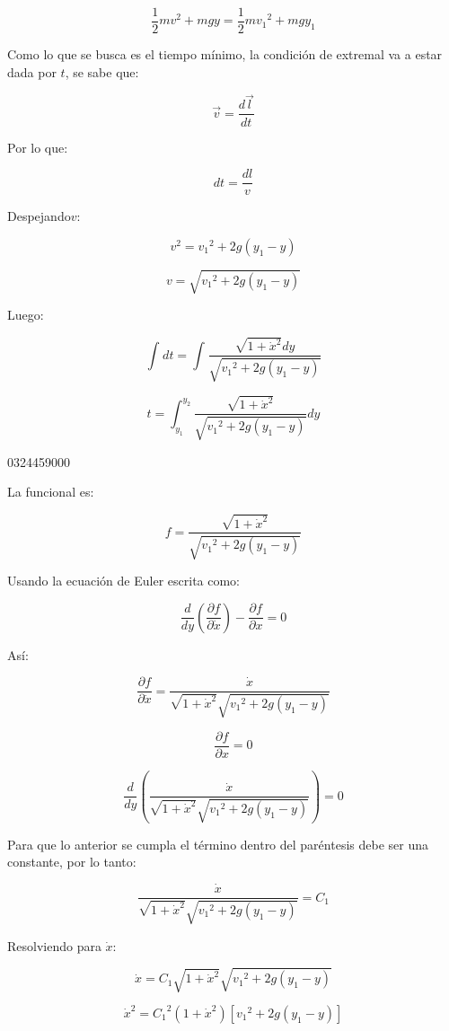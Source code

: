 \documentclass[]{article}
\begin{document}
\[\frac{1}{2}mv^{2} + mgy = \frac{1}{2}m{v_{1}}^{2} + mgy_{1}\]

Como lo que se busca es el tiempo mínimo, la condición de extremal va a
estar dada por \(t\), se sabe que:

\[\overrightarrow{v} = \frac{d\overrightarrow{l}}{dt}\]

Por lo que:

\[dt = \frac{dl}{v}\]

Despejando\(v\):

\[v^{2} = {v_{1}}^{2} + 2g\left( y_{1} - y \right)\]

\[v = \sqrt{{v_{1}}^{2} + 2g\left( y_{1} - y \right)}\]

Luego:

\[\int_{}^{}{dt} = \int_{}^{}\frac{\sqrt{1 + {\dot{x}}^{2}}dy}{\sqrt{{v_{1}}^{2} + 2g\left( y_{1} - y \right)}}\]

\[t = \int_{y_{1}}^{y_{2}}{\frac{\sqrt{1 + {\dot{x}}^{2}}}{\sqrt{{v_{1}}^{2} + 2g\left( y_{1} - y \right)}}dy}\]

0324459000

La funcional es:

\[f = \frac{\sqrt{1 + {\dot{x}}^{2}}}{\sqrt{{v_{1}}^{2} + 2g\left( y_{1} - y \right)}}\]

Usando la ecuación de Euler escrita como:

\[\frac{d}{dy}\left( \frac{\partial f}{\partial\dot{x}} \right) - \frac{\partial f}{\partial x} = 0\]

Así:

\[\frac{\partial f}{\partial\dot{x}} = \frac{\dot{x}}{\sqrt{1 + {\dot{x}}^{2}}\sqrt{{v_{1}}^{2} + 2g\left( y_{1} - y \right)}}\]

\[\frac{\partial f}{\partial x} = 0\]

\[\frac{d}{dy}\left( \frac{\dot{x}}{\sqrt{1 + {\dot{x}}^{2}}\sqrt{{v_{1}}^{2} + 2g\left( y_{1} - y \right)}} \right) = 0\]

Para que lo anterior se cumpla el término dentro del paréntesis debe ser
una constante, por lo tanto:

\[\frac{\dot{x}}{\sqrt{1 + {\dot{x}}^{2}}\sqrt{{v_{1}}^{2} + 2g\left( y_{1} - y \right)}} = C_{1}\]

Resolviendo para \(\dot{x}\):

\[\dot{x} = C_{1}\sqrt{1 + {\dot{x}}^{2}}\sqrt{{v_{1}}^{2} + 2g\left( y_{1} - y \right)}\]

\[{\dot{x}}^{2} = {C_{1}}^{2}\left( 1 + {\dot{x}}^{2} \right)\left\lbrack {v_{1}}^{2} + 2g\left( y_{1} - y \right) \right\rbrack\]
\end{document}
